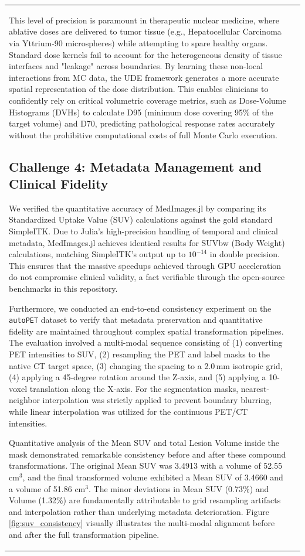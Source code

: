 \documentclass[10pt,letterpaper]{article}
\begin{document}
\begin{table}[H]
\begin{tabular}{|p{}|p{}|}
This level of precision is paramount in therapeutic nuclear medicine, where ablative doses are delivered to tumor tissue (e.g., Hepatocellular Carcinoma via Yttrium-90 microspheres) while attempting to spare healthy organs. Standard dose kernels fail to account for the heterogeneous density of tissue interfaces and "leakage" across boundaries. By learning these non-local interactions from MC data, the UDE framework generates a more accurate spatial representation of the dose distribution. This enables clinicians to confidently rely on critical volumetric coverage metrics, such as Dose-Volume Histograms (DVHs) to calculate D95 (minimum dose covering 95\% of the target volume) and D70, predicting pathological response rates accurately without the prohibitive computational costs of full Monte Carlo execution.

\subsection*{Challenge 4: Metadata Management and Clinical Fidelity}
We verified the quantitative accuracy of MedImages.jl by comparing its Standardized Uptake Value (SUV) calculations against the gold standard SimpleITK. Due to Julia's high-precision handling of temporal and clinical metadata, MedImages.jl achieves identical results for SUVbw (Body Weight) calculations, matching SimpleITK's output up to $10^{-14}$ in double precision. This ensures that the massive speedups achieved through GPU acceleration do not compromise clinical validity, a fact verifiable through the open-source benchmarks in this repository.

Furthermore, we conducted an end-to-end consistency experiment on the \texttt{autoPET} dataset \cite{Dexl_2025} to verify that metadata preservation and quantitative fidelity are maintained throughout complex spatial transformation pipelines. The evaluation involved a multi-modal sequence consisting of (1) converting PET intensities to SUV, (2) resampling the PET and label masks to the native CT target space, (3) changing the spacing to a 2.0\,mm isotropic grid, (4) applying a 45-degree rotation around the Z-axis, and (5) applying a 10-voxel translation along the X-axis. For the segmentation masks, nearest-neighbor interpolation was strictly applied to prevent boundary blurring, while linear interpolation was utilized for the continuous PET/CT intensities.

Quantitative analysis of the Mean SUV and total Lesion Volume inside the mask demonstrated remarkable consistency before and after these compound transformations. The original Mean SUV was 3.4913 with a volume of 52.55 $\text{cm}^3$, and the final transformed volume exhibited a Mean SUV of 3.4660 and a volume of 51.86 $\text{cm}^3$. The minor deviations in Mean SUV (0.73\%) and Volume (1.32\%) are fundamentally attributable to grid resampling artifacts and interpolation rather than underlying metadata deterioration. Figure \ref{fig:suv_consistency} visually illustrates the multi-modal alignment before and after the full transformation pipeline.


\end{tabular}
\end{table}
\end{document}
